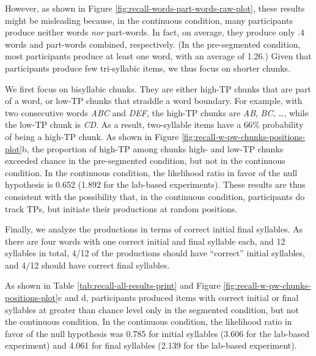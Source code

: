 \documentclass[]{article}
\begin{document}
However, as shown in Figure \ref{fig:recall-words-part-words-raw-plot}, these results might be misleading because, in the continuous condition, many participants produce neither words \emph{nor} part-words. In fact, on average, they produce only .4 words and part-words combined, respectively. (In the pre-segmented condition, most participants produce at least one word, with an average of 1.26.) Given that participants produce few tri-syllabic items, we thus focus on shorter chunks.


We first focus on bisyllabic chunks. They are either high-TP chunks that are part of a word, or low-TP chunks that straddle a word boundary. For example, with two consecutive words \emph{ABC} and \emph{DEF}, the high-TP chunks are \emph{AB}, \emph{BC}, \ldots{}, while the low-TP chunk is \emph{CD}. As a result, two-syllable items have a 66\% probability of being a high-TP chunk. As shown in Figure \ref{fig:recall-w-pw-chunks-positions-plot}b, the proportion of high-TP among chunks high- and low-TP chunks exceeded chance in the pre-segmented condition, but not in the continuous condition. In the continuous condition, the likelihood ratio in favor of the null hypothesis is 0.652 (1.892 for the lab-based experiments). These results are thus consistent with the possibility that, in the continuous condition, participants do track TPs, but initiate their productions at random positions.


Finally, we analyze the productions in terms of correct initial final syllables. As there are four words with one correct initial and final syllable each, and 12 syllables in total, 4/12 of the productions should have ``correct'' initial syllables, and 4/12 should have correct final syllables.

As shown in Table \ref{tab:recall-all-results-print} and Figure \ref{fig:recall-w-pw-chunks-positions-plot}c and d, participants produced items with correct initial or final syllables at greater than chance level only in the segmented condition, but not the continuous condition. In the continuous condition, the likelihood ratio in favor of the null hypothesis was 0.785 for initial syllables (3.606 for the lab-based experiment) and 4.061 for final syllables (2.139 for the lab-based experiment).
\end{document}
